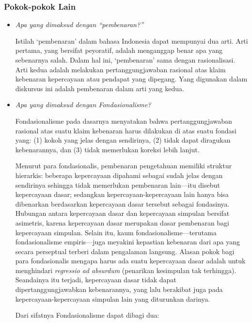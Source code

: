 \documentclass[10pt,a4paper]{article}
\begin{document}
\begin{multicols}{2}
\hypertarget{pokok-pokok-lain-1}{%
\subsubsection{Pokok-pokok Lain}\label{pokok-pokok-lain-1}}

\begin{itemize}
\item
  \emph{Apa yang dimaksud dengan ``pembenaran?''}

  Istilah `pembenaran' dalam bahasa Indonesia dapat mempunyai dua arti.
  Arti pertama, yang bersifat peyoratif, adalah menganggap benar apa
  yang sebenarnya salah. Dalam hal ini, `pembenaran' sama dengan
  rasionalisasi. Arti kedua adalah melakukan pertanggungjawaban rasional
  atas klaim kebenaran kepercayaan atau pendapat yang dipegang. Yang
  digunakan dalam diskursus ini adalah pembenaran dalam arti yang kedua.
\item
  \emph{Apa yang dimaksud dengan Fondasionalisme?}

  Fondasionalisme pada dasarnya menyatakan bahwa pertanggungjawaban
  rasional atas suatu klaim kebenaran harus dilakukan di atas suatu
  fondasi yang: (1) kokoh yang jelas dengan sendirinya, (2) tidak dapat
  diragukan kebenarannya, dan (3) tidak memerlukan koreksi lebih lanjut.

  Menurut para fondasionalis, pembenaran pengetahuan memiliki struktur
  hierarkis: beberapa kepercayaan dipahami sebagai sudah jelas dengan
  sendirinya sehingga tidak memerlukan pembenaran lain---itu disebut
  kepercayaan dasar; sedangkan kepercayaan-kepercayaan lain hanya bisa
  dibenarkan berdasarkan kepercayaan dasar tersebut sebagai fondasinya.
  Hubungan antara kepercayaan dasar dan kepercayaan simpulan bersifat
  asimetris, karena kepercayaan dasar merupakan dasar pembenaran bagi
  kepercayaan simpulan. Selain itu, kaum fondasionalisme---terutama
  fondasionalisme empiris---juga meyakini kepastian kebenaran dari apa
  yang secara perseptual terberi dalam pengalaman langsung. Alasan pokok
  bagi para fondasionalis mengapa harus ada suatu kepercayaan dasar
  adalah untuk menghindari \emph{regressio ad absurdum} (penarikan
  kesimpulan tak terhingga). Seandainya itu terjadi, kepercayaan dasar
  tidak dapat dipertanggungjawabkan kebenarannya, yang lalu berakibat
  juga pada kepercayaan-kepercayaan simpulan lain yang diturunkan
  darinya.

  Dari sifatnya Fondasionalisme dapat dibagi dua:


\end{itemize}
\end{multicols}
\end{document}
